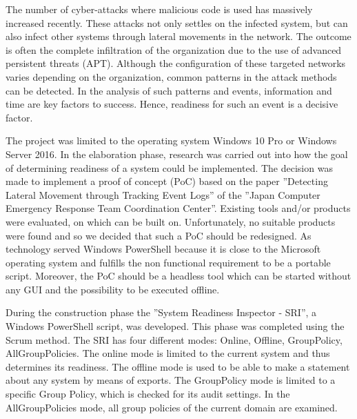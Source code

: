
\thispagestyle{plain}
\renewcommand\section{\stdsection}
The number of cyber-attacks where malicious code is used has massively increased recently. These attacks not only settles on the infected system, but can also infect other systems through lateral movements in the network. The outcome is often the complete infiltration of the organization due to the use of advanced persistent threats (APT). Although the configuration of these targeted networks varies depending on the organization, common patterns in the attack methods can be detected. In the analysis of such patterns and events, information and time are key factors to success. Hence, readiness for such an event is a decisive factor.

The project was limited to the operating system Windows 10 Pro or Windows Server 2016. In the elaboration phase, research was carried out into how the goal of determining readiness of a system could be implemented. The decision was made to implement a proof of concept (PoC) based on the paper ''Detecting Lateral Movement through Tracking Event Logs'' of the ''Japan Computer Emergency Response Team Coordination Center''. Existing tools and/or products were evaluated, on which can be built on. Unfortunately, no suitable products were found and so we decided that such a PoC should be redesigned. As technology served Windows PowerShell because it is close to the Microsoft operating system and fulfills the non functional requirement to be a portable script. Moreover, the PoC should be a headless tool which can be started without any GUI and the possibility to be executed offline.


During the construction phase the ''System Readiness Inspector - SRI'', a Windows PowerShell script, was developed. This phase was completed using the Scrum method. The SRI has four different modes: Online, Offline, GroupPolicy, AllGroupPolicies. The online mode is limited to the current system and thus determines its readiness. The offline mode is used to be able to make a statement about any system by means of exports. The GroupPolicy mode is limited to a specific Group Policy, which is checked for its audit settings. In the AllGroupPolicies mode, all group policies of the current domain are examined. 
\thispagestyle{plain}